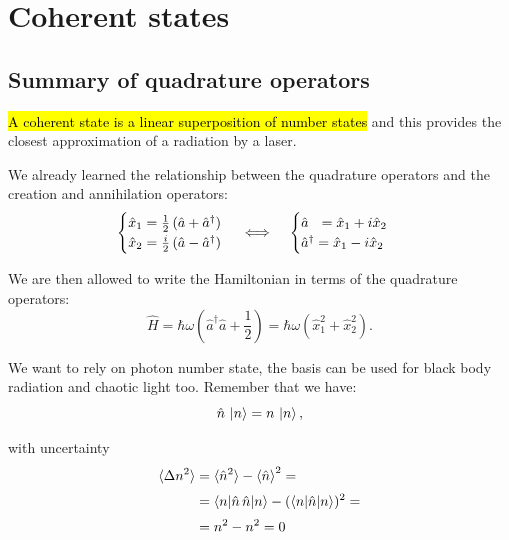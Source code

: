 \section{Coherent states}\label{sec:coherent-states}

\subsection{Summary of quadrature operators}

\hl{A coherent state is a linear superposition of number states} and this provides the closest approximation of a radiation by a laser. 

We already learned the relationship between the quadrature operators and the creation and annihilation operators:
\begin{equation}\label{eqn:13-quadratures-creation-annihilation-operators}
\begin{cases}
    \hat{x}_1 = \frac{1}{2}\, (\hat{a}+\hat{a}^\dagger ) \\
    \hat{x}_2 = \frac{i}{2}\, (\hat{a}-\hat{a}^\dagger ) 
\end{cases} \iff \hspace{2ex} \begin{cases}
    \hat{a} \hspace{0.23cm} = \hat{x}_1+i\hat{x}_2\\
    \hat{a}^\dagger  = \hat{x}_1-i\hat{x}_2
\end{cases}
\end{equation}

We are then allowed to write the Hamiltonian in terms of the quadrature operators:
\begin{equation}\label{eqn:13-hamiltonian-quadratures}
\hat{H} = \hbar \omega \left(\hat{a}^\dagger \hat{a}+\frac{1}{2}\right) =
\hbar \omega \left(\hat{x}_1^2+\hat{x}_2^2\right).
\end{equation}

We want to rely on photon number state, the basis can be used for black body radiation and chaotic light too. Remember that we have:
\begin{equation}\label{eqn:13-number-operator-eigenvalue-equation}
\hat{n}\,\ket{n} = n\, \ket{n},
\end{equation}

with uncertainty
\begin{equation}\label{eqn:13-number-operator-uncertainty}
\begin{split}
\braket{\Delta n^2} &= \braket{\hat{n}^2} - \braket{\hat{n}}^2 =\\[0.5ex]
&= \braket{n|\hat{n}\, \hat{n}|n}-(\braket{n|\hat{n}|n})^2 = \\[0.5ex]
&= n^2-n^2 = 0
\end{split}
\end{equation}

